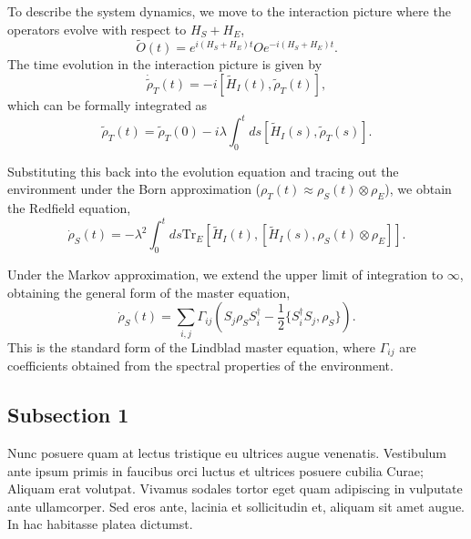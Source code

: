 To describe the system dynamics, we move to the interaction picture where the operators evolve with respect to $H_S + H_E$,
\begin{equation}
    \tilde{O}(t) = e^{i(H_S+H_E)t} O e^{-i(H_S+H_E)t}.
\end{equation}
The time evolution in the interaction picture is given by
\begin{equation}
    \dot{\tilde{\rho}}_T(t) = -i [\tilde{H}_I(t), \tilde{\rho}_T(t)],
\end{equation}
which can be formally integrated as
\begin{equation}
    \tilde{\rho}_T(t) = \tilde{\rho}_T(0) - i \lambda \int_0^t ds [\tilde{H}_I(s), \tilde{\rho}_T(s)].
\end{equation}

Substituting this back into the evolution equation and tracing out the environment under the Born approximation ($\rho_T(t) \approx \rho_S(t) \otimes \rho_E$), we obtain the Redfield equation,
\begin{equation}
    \dot{\rho}_S(t) = -\lambda^2 \int_0^t ds \mathrm{Tr}_E [\tilde{H}_I(t), [\tilde{H}_I(s), \rho_S(t) \otimes \rho_E]].
\end{equation}

Under the Markov approximation, we extend the upper limit of integration to $\infty$, obtaining the general form of the master equation,
\begin{equation}
    \dot{\rho}_S(t) = \sum_{i,j} \Gamma_{ij} (S_j \rho_S S_i^\dagger - \frac{1}{2} \{ S_i^\dagger S_j, \rho_S \}).
\end{equation}
This is the standard form of the Lindblad master equation, where $\Gamma_{ij}$ are coefficients obtained from the spectral properties of the environment.

\subsection{Subsection 1}

Nunc posuere quam at lectus tristique eu ultrices augue venenatis. Vestibulum ante ipsum primis in faucibus orci luctus et ultrices posuere cubilia Curae; Aliquam erat volutpat. Vivamus sodales tortor eget quam adipiscing in vulputate ante ullamcorper. Sed eros ante, lacinia et sollicitudin et, aliquam sit amet augue. In hac habitasse platea dictumst.

